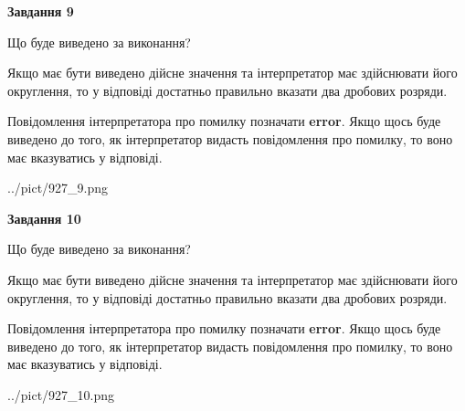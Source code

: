 \documentclass[12pt, ukrainian]{article}
\begin{document}
{\begin {Large}
{\begin {center}\textbf{Завдання 9}\end {center}}\par
Що буде виведено за виконання? \par

Якщо має бути виведено дійсне значення та інтерпретатор має здійснювати його округлення, 
то у відповіді достатньо правильно вказати два дробових розряди.

Повідомлення інтерпретатора про помилку позначати \textbf{error}.
Якщо щось буде виведено до того, як інтерпретатор видасть повідомлення про помилку, 
то воно має вказуватись у відповіді. \par

\begin{center}
	{../pict/927_9.png}
\end{center}
\newpage

{\begin {center}\textbf{Завдання 10}\end {center}}\par
Що буде виведено за виконання? \par

Якщо має бути виведено дійсне значення та інтерпретатор має здійснювати його округлення, 
то у відповіді достатньо правильно вказати два дробових розряди.

Повідомлення інтерпретатора про помилку позначати \textbf{error}.
Якщо щось буде виведено до того, як інтерпретатор видасть повідомлення про помилку, 
то воно має вказуватись у відповіді. \par

\begin{center}
	{../pict/927_10.png}
\end{center}
\newpage

\end {Large}}
\end{document}
